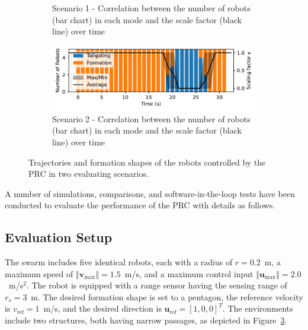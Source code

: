 \begin{figure}
\begin{subfigure}[b]{0.495\textwidth}
    \caption{Scenario 1 - Correlation between the number of  robots (bar chart) in each mode and the scale factor (black line) over time}
    \label{fig:cor1}
    \end{subfigure}
    \begin{subfigure}[b]{0.495\textwidth}
    \includegraphics[width=\textwidth]{paper3/images/correlation_scen2.pdf}
    \caption{Scenario 2 - Correlation between the number of  robots (bar chart) in each mode and the scale factor (black line) over time}
    \label{fig:cor2}
    \end{subfigure}
    \caption{Trajectories and formation shapes of the robots controlled by the PRC in two evaluating scenarios.}
    \label{fig:path}
\end{figure}

A number of simulations, comparisons, and software-in-the-loop tests have been conducted to evaluate the performance of the PRC with details as follows.

\subsection{Evaluation Setup}
The swarm includes five identical robots, each with a radius of $r=0.2$~m, a maximum speed of $\left\Vert \mathbf{v}_\text{max}\right\Vert=1.5$~m/s, and a maximum control input $\left\Vert \mathbf{u}_\text{max}\right\Vert=2.0$~m/s$^2$. The robot is equipped with a range sensor having the sensing range of $r_s=3$~m. The desired formation shape is set to a pentagon, the reference velocity is $v_\text{ref}=1$~m/s, and the desired direction is $\mathbf{u}_\text{ref}=[1,0,0]^T$. The environments include two structures, both having narrow passages, as depicted in Figure~\ref{fig:path}.

